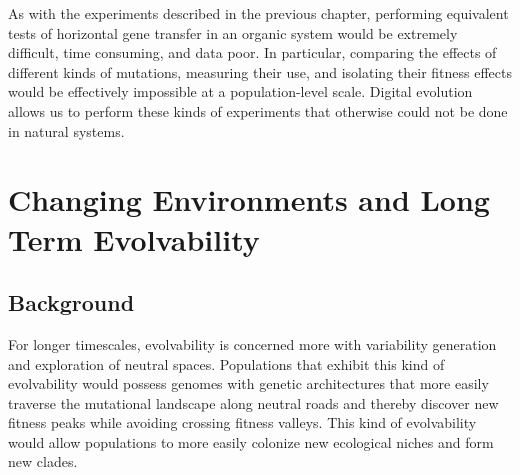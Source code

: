 \documentclass[PhD]{msu-thesis}
\begin{document}
As with the experiments described in the previous chapter, performing equivalent tests of horizontal gene transfer in an organic system would be extremely difficult, time consuming, and data poor. In particular, comparing the effects of different kinds of mutations, measuring their use, and isolating their fitness effects would be effectively impossible at a population-level scale. Digital evolution allows us to perform these kinds of experiments that otherwise could not be done in natural systems. 



\chapter{Changing Environments and Long Term Evolvability}
\label{chap:ce-longterm}
\section{Background}

For longer timescales,
evolvability is concerned more with variability generation and exploration of neutral spaces. Populations that exhibit this kind of evolvability would possess genomes with genetic architectures
that more easily traverse the mutational landscape along neutral roads and thereby discover new fitness peaks while avoiding crossing fitness valleys. This kind of evolvability would allow populations to more easily colonize new ecological niches and form new clades\cite{kirschner_evolvability_1998,brookfield_evolution:_2001}.
\end{document}

